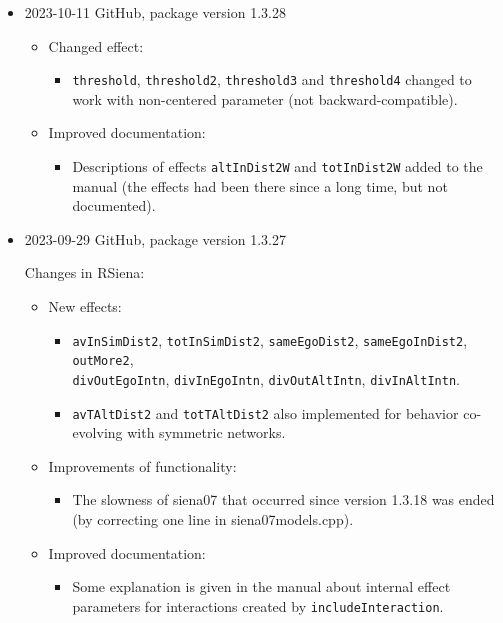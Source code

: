 \documentclass[a4paper,fleqn,11pt]{article}
\newcommand{\+}{\, + \,}
\newcommand{\sfn}[1]{\textsf{#1}}
\begin{document}
\begin{small}
\begin{itemize}
\item 2023-10-11 GitHub, package version 1.3.28
\begin{itemize}
\item Changed effect:
   \begin{itemize}
  \item \texttt{threshold}, \texttt{threshold2}, \texttt{threshold3} and \texttt{threshold4}
    changed to work with non-centered parameter (not backward-compatible).
    \end{itemize}
\item Improved documentation:
   \begin{itemize}
  \item Descriptions of effects \texttt{altInDist2W} and \texttt{totInDist2W} added
  to the manual (the effects had been there since a long time, but not documented).
    \end{itemize}
\end{itemize}


\item 2023-09-29 GitHub, package version 1.3.27


Changes in RSiena:
\begin{itemize}
\item New effects:
   \begin{itemize}
  \item \texttt{avInSimDist2}, \texttt{totInSimDist2}, \texttt{sameEgoDist2},
     \texttt{sameEgoInDist2},     \texttt{outMore2},\\
      \texttt{divOutEgoIntn}, \texttt{divInEgoIntn}, \texttt{divOutAltIntn},
    \texttt{divInAltIntn}.
  \item \texttt{avTAltDist2} and \texttt{totTAltDist2} also implemented for behavior co-evolving
    with symmetric networks.
    \end{itemize}
\item Improvements of functionality:
   \begin{itemize}
  \item The slowness of \sfn{siena07} that occurred since version 1.3.18
    was ended (by correcting one line in \sfn{siena07models.cpp}).
    \end{itemize}
\item Improved documentation:
   \begin{itemize}
  \item Some explanation is given in the manual about internal effect parameters
    for interactions created by \texttt{includeInteraction}.
    \end{itemize}
\end{itemize}


\end{itemize}
\end{small}
\end{document}
